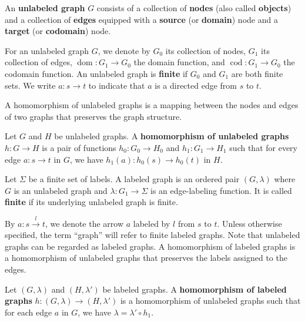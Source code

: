 \begin{definition}
    \label{def:graph:unlabeled}
    An \textbf{unlabeled graph} \( G \) consists of a collection of \textbf{nodes} (also called \textbf{objects}) and a collection of \textbf{edges} equipped with a \textbf{source} (or \textbf{domain}) node and a \textbf{target} (or \textbf{codomain}) node. 
    
    For an unlabeled graph \( G \), we denote by \( G_0 \) its collection of nodes, \( G_1 \) its collection of edges, \( \operatorname{dom}:G_1{\to}G_0 \) the domain function, and \( \operatorname{cod}:G_1{\to}G_0 \) the codomain function. An unlabeled graph is \textbf{finite} if \( G_0 \) and \( G_1 \) are both finite sets.
    We write \( a: s \mathop{\to} t \) to indicate that \( a \) is a directed edge from \( s \) to \( t \).
\end{definition}   
A homomorphism of unlabeled graphs is a mapping between the nodes and edges of two graphs that preserves the graph structure.
\begin{definition}
    \label{def:unlabeled_graph:homomorphism}
    Let \( G \) and \( H \) be unlabeled graphs. A \textbf{homomorphism of unlabeled graphs} \( h: G \mathop{\to} H \) is a pair of functions \( h_0: G_0 \mathop{\to} H_0 \) and \( h_1: G_1 \mathop{\to} H_1 \) such that for every edge \( a: s \mathop{\to} t \) in \( G \), we have \( h_1(a) : h_0(s) \mathop{\to} h_0(t) \) in \( H \).
\end{definition}
\begin{definition}
    \label{def:graph}
    Let \(\Sigma\) be a finite set of labels. A labeled graph is an ordered pair \((G,\lambda)\) where \( G \) is an unlabeled graph and \( \lambda : G_1 \mathop{\rightarrow} \Sigma\) is an edge-labeling function. 
    It is called \textbf{finite} if its underlying unlabeled graph is finite.  
\end{definition}
By $a : s\overset{l}{\rightarrow} t$, we denote the arrow $a$ labeled by $l$ from $s$ to $t$. Unless otherwise specified, the term \enquote{graph} will refer to finite labeled graphs. Note that unlabeled graphs can be regarded as labeled graphs. A homomorphism of labeled graphs is a homomorphism of unlabeled graphs that preserves the labels assigned to the edges.
\begin{definition}
    \label{def:graph:homomorphism}
    Let \( (G,\lambda) \) and \( (H,\lambda') \) be labeled graphs. A \textbf{homomorphism of labeled graphs} \( h:(G,\lambda) \mathop{\rightarrow} (H,\lambda') \) is a homomorphism of unlabeled graphs such that for each edge \( a \) in \( G \), we have \( \lambda \mathop{=} \lambda' \circ h_1 \).
\end{definition}
